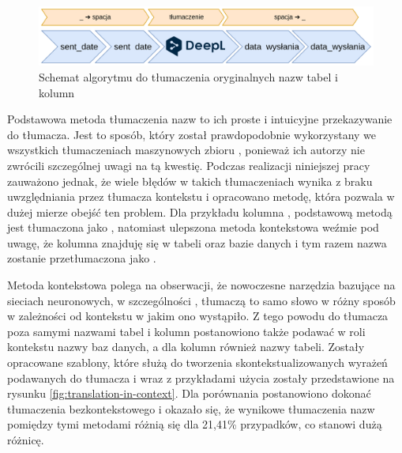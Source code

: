 \begin{figure}[ht!]
  \centering
  \includegraphics[width=1.0\linewidth]{images/multi_word_translation.png}
  \caption{Schemat algorytmu do tłumaczenia oryginalnych nazw tabel i kolumn}
  \label{fig:multi-word-translation}
\end{figure}

Podstawowa metoda tłumaczenia nazw to ich proste i intuicyjne przekazywanie do tłumacza. Jest to sposób, który został prawdopodobnie wykorzystany we wszystkich tłumaczeniach maszynowych zbioru , ponieważ ich autorzy nie zwrócili szczególnej uwagi na tą kwestię. Podczas realizacji niniejszej pracy zauważono jednak, że wiele błędów w takich tłumaczeniach wynika z braku uwzględniania przez tłumacza kontekstu i opracowano metodę, która pozwala w dużej mierze obejść ten problem. Dla przykładu kolumna , podstawową metodą jest tłumaczona jako , natomiast ulepszona metoda kontekstowa weźmie pod uwagę, że kolumna znajduję się w tabeli  oraz bazie danych  i tym razem nazwa zostanie przetłumaczona jako .

Metoda kontekstowa polega na obserwacji, że nowoczesne narzędzia bazujące na sieciach neuronowych, w szczególności , tłumaczą to samo słowo w różny sposób w zależności od kontekstu w jakim ono wystąpiło. Z tego powodu do tłumacza poza samymi nazwami tabel i kolumn postanowiono także podawać w roli kontekstu nazwy baz danych, a dla kolumn również nazwy tabeli. Zostały opracowane szablony, które służą do tworzenia skontekstualizowanych wyrażeń podawanych do tłumacza i wraz z przykładami użycia zostały przedstawione na rysunku \ref{fig:translation-in-context}. Dla porównania postanowiono dokonać tłumaczenia bezkontekstowego i okazało się, że wynikowe tłumaczenia nazw pomiędzy tymi metodami różnią się dla 21,41\% przypadków, co stanowi dużą różnicę.

